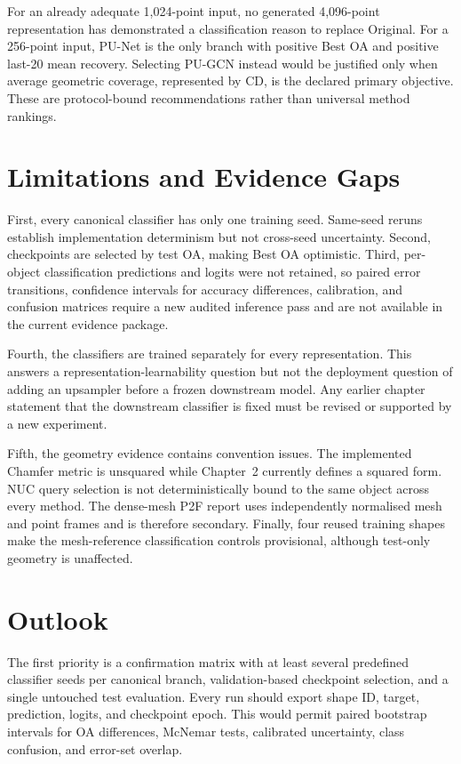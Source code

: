 For an already adequate 1,024-point input, no generated 4,096-point representation has demonstrated a classification reason to replace Original. For a 256-point input, PU-Net is the only branch with positive Best OA and positive last-20 mean recovery. Selecting PU-GCN instead would be justified only when average geometric coverage, represented by CD, is the declared primary objective. These are protocol-bound recommendations rather than universal method rankings.

\section{Limitations and Evidence Gaps}

First, every canonical classifier has only one training seed. Same-seed reruns establish implementation determinism but not cross-seed uncertainty. Second, checkpoints are selected by test OA, making Best OA optimistic. Third, per-object classification predictions and logits were not retained, so paired error transitions, confidence intervals for accuracy differences, calibration, and confusion matrices require a new audited inference pass and are not available in the current evidence package.

Fourth, the classifiers are trained separately for every representation. This answers a representation-learnability question but not the deployment question of adding an upsampler before a frozen downstream model. Any earlier chapter statement that the downstream classifier is fixed must be revised or supported by a new experiment.

Fifth, the geometry evidence contains convention issues. The implemented Chamfer metric is unsquared while Chapter~2 currently defines a squared form. NUC query selection is not deterministically bound to the same object across every method. The dense-mesh P2F report uses independently normalised mesh and point frames and is therefore secondary. Finally, four reused training shapes make the mesh-reference classification controls provisional, although test-only geometry is unaffected.

\section{Outlook}

The first priority is a confirmation matrix with at least several predefined classifier seeds per canonical branch, validation-based checkpoint selection, and a single untouched test evaluation. Every run should export shape ID, target, prediction, logits, and checkpoint epoch. This would permit paired bootstrap intervals for OA differences, McNemar tests, calibrated uncertainty, class confusion, and error-set overlap.

